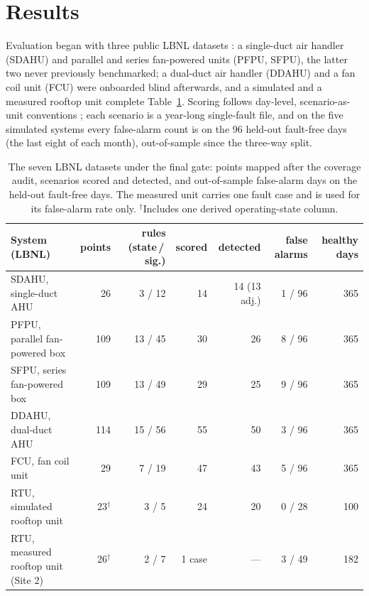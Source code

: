 \documentclass[11pt,letterpaper]{article}
\begin{document}
\section{Results}
\label{sec:results}

Evaluation began with three public LBNL datasets \cite{granderson2020lbnlfdddata,granderson2023lbnlfdddata}: a single-duct air handler (SDAHU) and parallel and series fan-powered units (PFPU, SFPU), the latter two never previously benchmarked; a dual-duct air handler (DDAHU) and a fan coil unit (FCU) were onboarded blind afterwards, and a simulated and a measured rooftop unit complete Table~\ref{tab:systems}. Scoring follows day-level, scenario-as-unit conventions \cite{yuill2013fddprotocol,frank2018fddevaluation}; each scenario is a year-long single-fault file, and on the five simulated systems every false-alarm count is on the 96 held-out fault-free days (the last eight of each month), out-of-sample since the three-way split.

\begin{table}[t]
\centering
\footnotesize
\setlength{\tabcolsep}{3.5pt}
\begin{tabular}{@{}lrrrrrr@{}}
\hline
System (LBNL) & points & rules (state\,/\,sig.) & scored & detected & false alarms & healthy days \\
\hline
SDAHU, single-duct AHU & 26 & 3 / 12 & 14 & 14 (13 adj.) & 1 / 96 & 365 \\
PFPU, parallel fan-powered box & 109 & 13 / 45 & 30 & 26 & 8 / 96 & 365 \\
SFPU, series fan-powered box & 109 & 13 / 49 & 29 & 25 & 9 / 96 & 365 \\
DDAHU, dual-duct AHU & 114 & 15 / 56 & 55 & 50 & 3 / 96 & 365 \\
FCU, fan coil unit & 29 & 7 / 19 & 47 & 43 & 5 / 96 & 365 \\
RTU, simulated rooftop unit & 23$^\dagger$ & 3 / 5 & 24 & 20 & 0 / 28 & 100 \\
RTU, measured rooftop unit (Site 2) & 26$^\dagger$ & 2 / 7 & 1 case & --- & 3 / 49 & 182 \\
\hline
\end{tabular}
\caption{The seven LBNL datasets under the final gate: points mapped after the coverage audit, scenarios scored and detected, and out-of-sample false-alarm days on the held-out fault-free days. The measured unit carries one fault case and is used for its false-alarm rate only. $^\dagger$Includes one derived operating-state column.}
\label{tab:systems}
\end{table}
\end{document}
